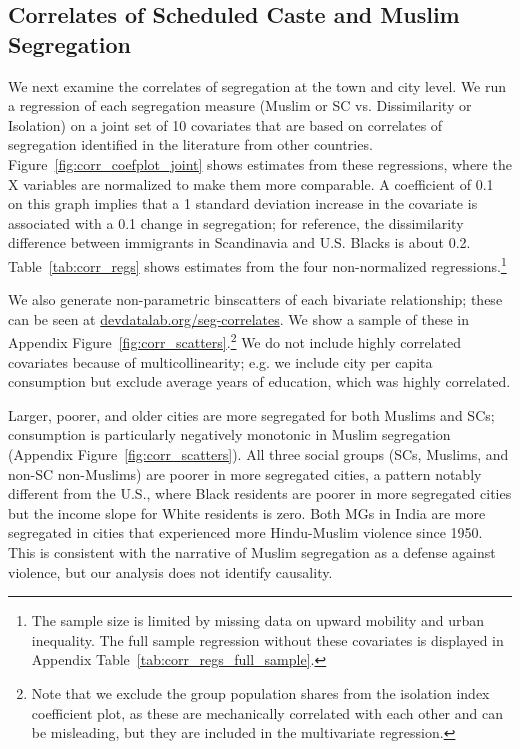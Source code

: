 \documentclass[12pt]{article}
\begin{document}
\subsection{Correlates of Scheduled Caste and Muslim Segregation}
\label{sec:correlates}

We next examine the correlates of segregation at the town and city level. We run a regression of each segregation measure (Muslim or SC vs. Dissimilarity or Isolation) on a joint set of 10 covariates that are based on correlates of segregation identified in the literature from other countries. Figure~\ref{fig:corr_coefplot_joint} shows estimates from these regressions, where the X variables are normalized to make them more comparable. A coefficient of 0.1 on this graph implies that a 1 standard deviation increase in the covariate is associated with a 0.1 change in segregation; for reference, the dissimilarity difference between immigrants in Scandinavia and U.S. Blacks is about 0.2. Table~\ref{tab:corr_regs} shows estimates from the four non-normalized regressions.\footnote{The sample size is limited by missing data on upward mobility and urban inequality. The full sample regression without these covariates is displayed in Appendix Table~\ref{tab:corr_regs_full_sample}.}

We also generate non-parametric binscatters of each bivariate relationship; these can be seen at \href{https://devdatalab.org/seg-correlates}{devdatalab.org/seg-correlates}. We show a sample of these in Appendix Figure~\ref{fig:corr_scatters}.\footnote{Note that we exclude the group population shares from the isolation index coefficient plot, as these are mechanically correlated with each other and can be misleading, but they are included in the multivariate regression.} We do not include highly correlated covariates because of multicollinearity; e.g. we include city per capita consumption but exclude average years of education, which was highly correlated.

  Larger, poorer, and older cities are more segregated for both Muslims and SCs; consumption is particularly negatively monotonic in Muslim segregation (Appendix Figure~\ref{fig:corr_scatters}). All three social groups (SCs, Muslims, and non-SC non-Muslims) are poorer in more segregated cities, a pattern notably different from the U.S., where Black residents are poorer in more segregated cities but the income slope for White residents is zero. Both MGs in India are more segregated in cities that experienced more Hindu-Muslim violence since 1950. This is consistent with the narrative of Muslim segregation as a defense against violence, but our analysis does not identify causality.
\end{document}
